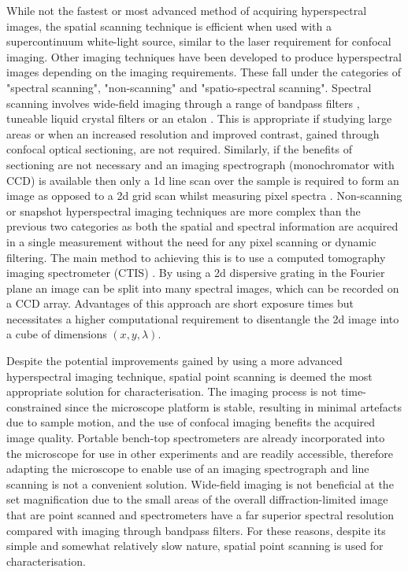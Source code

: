 \documentclass{article}
\begin{document}
While not the fastest or most advanced method of acquiring hyperspectral images, the spatial scanning technique is efficient when used with a supercontinuum white-light source, similar to the laser requirement for confocal imaging. Other imaging techniques have been developed to produce hyperspectral images depending on the imaging requirements. These fall under the categories of "spectral scanning", "non-scanning" and "spatio-spectral scanning".
Spectral scanning involves wide-field imaging through a range of bandpass filters \cite{iga2012development}, tuneable liquid crystal filters \cite{slawson1999hyperspectral, gat2000imaging} or an etalon \cite{daly2000tunable}. This is appropriate if studying large areas or when an increased resolution and improved contrast, gained through confocal optical sectioning, are not required. Similarly, if the benefits of sectioning are not necessary and an imaging spectrograph (monochromator with CCD) is available then only a 1d line scan over the sample is required to form an image as opposed to a 2d grid scan whilst measuring pixel spectra \cite{schultz2001hyperspectral}.
Non-scanning or snapshot hyperspectral imaging techniques are more complex than the previous two categories as both the spatial and spectral information are acquired in a single measurement without the need for any pixel scanning or dynamic filtering. The main method to achieving this is to use a computed tomography imaging spectrometer (CTIS) \cite{okamoto1991simultaneous, bulygin1992spectrotomography, okamoto1993simultaneous, descour1995computed}. By using a 2d dispersive grating in the Fourier plane an image can be split into many spectral images, which can be recorded on a CCD array. Advantages of this approach are short exposure times but necessitates a higher computational requirement to disentangle the 2d image into a cube of dimensions $(x,y,\lambda)$.

Despite the potential improvements gained by using a more advanced hyperspectral imaging technique, spatial point scanning is deemed the most appropriate solution for characterisation. The imaging process is not time-constrained since the microscope platform is stable, resulting in minimal artefacts due to sample motion, and the use of confocal imaging benefits the acquired image quality. Portable bench-top spectrometers are already incorporated into the microscope for use in other experiments and are readily accessible, therefore adapting the microscope to enable use of an imaging spectrograph and line scanning is not a convenient solution. Wide-field imaging is not beneficial at the set magnification due to the small areas of the overall diffraction-limited image that are point scanned and spectrometers have a far superior spectral resolution compared with imaging through bandpass filters. For these reasons, despite its simple and somewhat relatively slow nature, spatial point scanning is used for characterisation.

\end{document}
